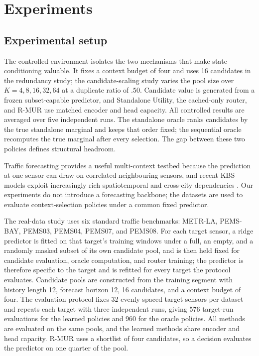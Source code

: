 \section{Experiments}
\label{sec:experiments}

\subsection{Experimental setup}

The controlled environment isolates the two mechanisms that make state
conditioning valuable. It fixes a context budget of four and uses 16 candidates
in the redundancy study; the candidate-scaling study varies the pool size over
$K=4,8,16,32,64$ at a duplicate ratio of $.50$. Candidate value is generated
from a frozen subset-capable predictor, and Standalone Utility, the cached-only
router, and R-MUR use matched encoder and head capacity. All controlled results
are averaged over five independent runs. The standalone oracle ranks candidates
by the true standalone marginal and keeps that order fixed; the sequential
oracle recomputes the true marginal after every selection. The gap between
these two policies defines structural headroom.

Traffic forecasting provides a useful multi-context testbed because the
prediction at one sensor can draw on correlated neighbouring sensors, and
recent KBS models exploit increasingly rich spatiotemporal and cross-city
dependencies \citep{yang2025crosscity,yao2025shkd,zhou2025transformer,yan2026freqmamba}.
Our experiments do not introduce a forecasting backbone; the datasets are used
to evaluate context-selection policies under a common fixed predictor.

The real-data study uses six standard traffic benchmarks: METR-LA, PEMS-BAY,
PEMS03, PEMS04, PEMS07, and PEMS08. For each target sensor, a ridge predictor is fitted on
that target's training windows under a full, an empty, and a randomly masked
subset of its own candidate pool, and is then held fixed for candidate
evaluation, oracle computation, and router training; the predictor is
therefore specific to the target and is refitted for every target the protocol
evaluates. Candidate pools are constructed from the training segment with
history length 12, forecast horizon 12, 16 candidates, and a context budget of
four. The evaluation protocol fixes 32 evenly spaced target sensors per dataset
and repeats each target with three independent runs, giving 576 target-run
evaluations for the learned policies and 960 for the oracle policies. All
methods are evaluated on the same pools, and the learned methods share encoder
and head capacity. R-MUR uses a shortlist of four candidates, so a decision
evaluates the predictor on one quarter of the pool.

